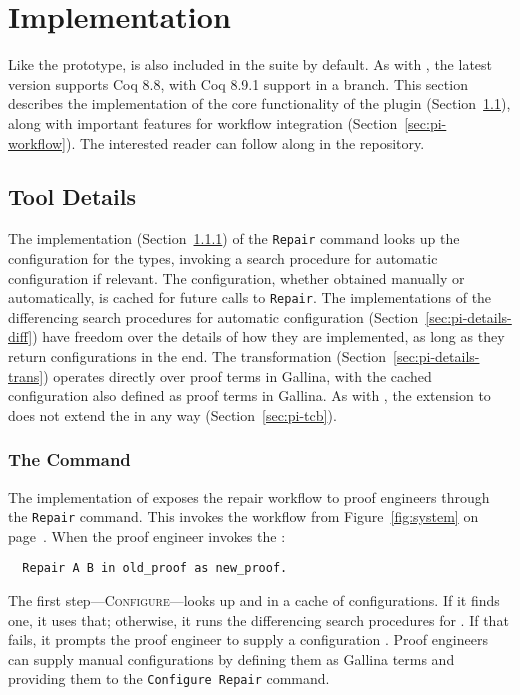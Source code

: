 \section{Implementation}
\label{sec:pi-implementation}

Like the  prototype,
 is also included in the   suite by default.
As with \sysname, the latest version supports Coq 8.8, with Coq 8.9.1 support in a branch.
This section describes the implementation of the core functionality of the \toolnamec plugin (Section~\ref{sec:pi-details}),
along with important features for workflow integration (Section~\ref{sec:pi-workflow}).
The interested reader can follow along in the repository.

\subsection{Tool Details}
\label{sec:pi-details}

The implementation (Section~\ref{sec:pi-details-command}) of the \lstinline{Repair} command
looks up the configuration for the types, invoking a search procedure for automatic configuration if relevant.
The configuration, whether obtained manually or automatically, is cached for future calls to \lstinline{Repair}.
The implementations of the differencing search procedures for automatic configuration (Section~\ref{sec:pi-details-diff})
have freedom over the details of how they are implemented, as long as they return configurations in the end.
The transformation (Section~\ref{sec:pi-details-trans}) operates directly over proof terms in Gallina, with the cached configuration
also defined as proof terms in Gallina.
As with \sysname, the \toolnamec extension to \sysnamelong does not extend the  in any way (Section~\ref{sec:pi-tcb}).

\subsubsection{The Command}
\label{sec:pi-details-command}

The implementation of \toolnamec exposes the repair workflow
to proof engineers through the \lstinline{Repair} command. %
This invokes the workflow from Figure~\ref{fig:system} on page~\pageref{fig:system}.
When the proof engineer invokes the :

\begin{lstlisting}
  Repair A B in old_proof as new_proof.
\end{lstlisting}
The first step---\textsc{Configure}---looks up \Aa and \B in a cache of configurations.
If it finds one, it uses that; otherwise, it runs the differencing search procedures for .
If that fails, it prompts the proof engineer to supply a configuration .
Proof engineers can supply manual configurations by defining them as Gallina terms and
providing them to the \lstinline{Configure Repair} command.

